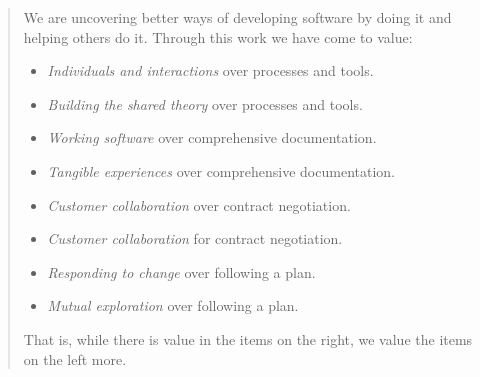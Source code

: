 %
\begin{quote}
    We are uncovering better ways of developing software by doing it and helping others do it.
    Through this work we have come to value:
    \begin{itemize}
        \item \emph{Individuals and interactions} over processes and tools.
        \item \emph{Building the shared theory} over processes and tools.
        
        \item \emph{Working software} over comprehensive documentation.
        \item \emph{Tangible experiences} over comprehensive documentation.
        
        \item \emph{Customer collaboration} over contract negotiation.
        \item \emph{Customer collaboration} for contract negotiation.

        \item \emph{Responding to change} over following a plan.
        \item \emph{Mutual exploration} over following a plan.
    \end{itemize}
    That is, while there is value in the items on the right, we value the items on the left more.
\end{quote}
%